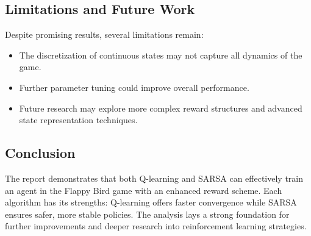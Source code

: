 \documentclass[9pt,a4paper]{article}
\begin{document}
\subsection{Limitations and Future Work}
Despite promising results, several limitations remain:
\begin{itemize}
    \item The discretization of continuous states may not capture all dynamics of the game.
    \item Further parameter tuning could improve overall performance.
    \item Future research may explore more complex reward structures and advanced state representation techniques.
\end{itemize}

\subsection{Conclusion}
The report demonstrates that both Q-learning and SARSA can effectively train an agent in the Flappy Bird game with an enhanced reward scheme. Each algorithm has its strengths: Q-learning offers faster convergence while SARSA ensures safer, more stable policies. The analysis lays a strong foundation for further improvements and deeper research into reinforcement learning strategies.

    
\end{document}

